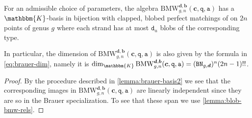 \documentclass[a4paper,11pt]{amsart}
\newcommand{\setstuff}[1]{\mathrm{#1}}
\newcommand{\KK}{\mathbbm{K}}
\newcommand{\bsym}[1]{\boldsymbol{#1}}
\newcommand{\varsym}[1]{\mathtt{#1}}
\newcommand{\qvar}{\varsym{q}}
\newcommand{\cpar}{\bsym{c}}
\newcommand{\bpar}{\bsym{b}}
\newcommand{\dpar}{\bsym{d}}
\newcommand{\dvar}{\varsym{d}}
\newcommand{\bbvar}{\varsym{BN}}
\newcommand{\avar}{\varsym{a}}
\numberwithin{equation}{section}
\let\fullref\autoref
\begin{document}
\begin{lemma}\label{lemma:bmw-basis-2}
For an admissible choice of parameters, the algebra 
$\setstuff{BMW}_{g,n}^{\dpar,\bpar}(\cpar,\qvar,\avar)$ 
has a $\KK$-basis in bijection with clapped, blobed 
perfect matchings of 
on $2n$ points of genus  
$g$ where each strand has at 
most $\dvar_{u}$ blobs of the corresponding type.
\end{lemma}

In particular, the dimension of  $\setstuff{BMW}_{g,n}^{\dpar,\bpar}(\cpar,\qvar,\avar)$
is also given by the formula in \eqref{eq:brauer-dim}, namely 
it is $\dim_{\KK}\setstuff{BMW}_{g,n}^{\dpar,\bpar}(\cpar,\qvar,\avar)
=(\bbvar_{g,\dpar})^{n}(2n-1)!!$.

\begin{proof}
By the procedure described in 
\fullref{lemma:brauer-basis2} we see that the 
corresponding images in 
$\setstuff{BMW}_{g,n}^{\dpar,\bpar}(\cpar,\qvar,\avar)$ are
linearly independent since they are so in the Brauer 
specialization. To see that these span we use 
\fullref{lemma:blob-bmw-rels}.
\end{proof}
\end{document}
